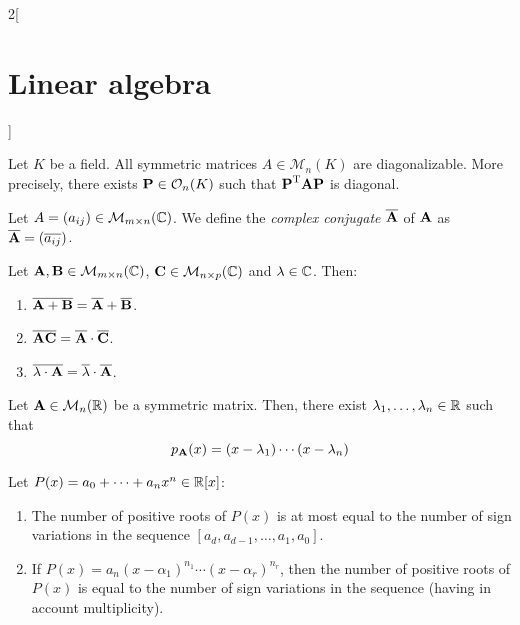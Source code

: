 \documentclass[../../../main_math.tex]{subfiles}
\begin{document}
\begin{multicols}{2}[\section{Linear algebra}]
\begin{theorem}
  \end{theorem}
  \begin{corollary}
    Let $K$ be a field. All symmetric matrices $A\in\mathcal{M}_n(K)$ are diagonalizable. More precisely, there exists $\boldsymbol{\mathrm{P}}\in\mathcal{O}_n(K)$ such that ${\boldsymbol{\mathrm{P}}}^{\mathrm{T}}\boldsymbol{\mathrm{A}}\boldsymbol{\mathrm{P}}$ is diagonal.
  \end{corollary}
  \begin{definition}
    Let $A=(a_{ij})\in\mathcal{M}_{m\times n}(\mathbb{C})$. We define the \emph{complex conjugate} $\overline{\boldsymbol{\mathrm{A}}}$ of $\boldsymbol{\mathrm{A}}$ as $\overline{\boldsymbol{\mathrm{A}}}=(\overline{a_{ij}})$.
  \end{definition}
  \begin{proposition}
    Let $\boldsymbol{\mathrm{A}},\boldsymbol{\mathrm{B}}\in\mathcal{M}_{m\times n}(\mathbb{C})$, $\boldsymbol{\mathrm{C}}\in\mathcal{M}_{n\times p}(\mathbb{C})$ and $\lambda\in\mathbb{C}$. Then:
    \begin{enumerate}
      \item $\overline{\boldsymbol{\mathrm{A}}+\boldsymbol{\mathrm{B}}}=\overline{\boldsymbol{\mathrm{A}}}+\overline{\boldsymbol{\mathrm{B}}}$.
      \item $\overline{\boldsymbol{\mathrm{A}}\boldsymbol{\mathrm{C}}}=\overline{\boldsymbol{\mathrm{A}}}\cdot\overline{\boldsymbol{\mathrm{C}}}$.
      \item $\overline{\lambda\cdot\boldsymbol{\mathrm{A}}}=\overline{\lambda}\cdot\overline{\boldsymbol{\mathrm{A}}}$.
    \end{enumerate}
  \end{proposition}
  \begin{corollary}
    Let $\boldsymbol{\mathrm{A}}\in\mathcal{M}_n(\mathbb{R})$ be a symmetric matrix. Then, there exist $\lambda_1,\ldots,\lambda_n\in\mathbb{R}$ such that $$p_{\boldsymbol{\mathrm{A}}}(x)=(x-\lambda_1 )\cdots(x-\lambda_n)$$
  \end{corollary}
  \begin{theorem}
    Let $P(x)=a_0+\cdots+a_nx^n\in\mathbb{R}[x]$:
    \begin{enumerate}
      \item The number of positive roots of $P(x)$ is at most equal to the number of sign variations in the sequence $[a_d,a_{d-1},\ldots,a_1,a_0]$.
      \item If $P(x)=a_n(x-\alpha_1)^{n_1}\cdots(x-\alpha_r)^{n_r}$, then the number of positive roots of $P(x)$ is equal to the number of sign variations in the sequence (having in account multiplicity).
    \end{enumerate}
  \end{theorem}
\end{multicols}
\end{document}
